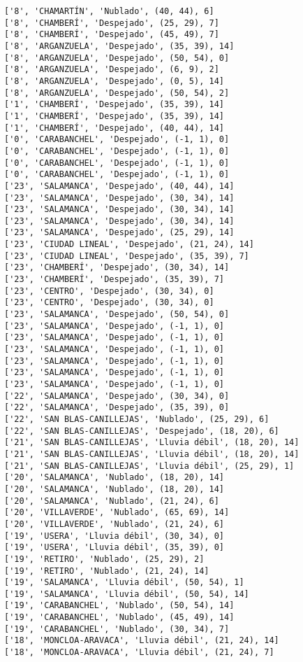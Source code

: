 \documentclass[11pt]{article}
\begin{document}
\begin{Verbatim}[commandchars=\\\{\}]
['8', 'CHAMARTÍN', 'Nublado', (40, 44), 6]
['8', 'CHAMBERÍ', 'Despejado', (25, 29), 7]
['8', 'CHAMBERÍ', 'Despejado', (45, 49), 7]
['8', 'ARGANZUELA', 'Despejado', (35, 39), 14]
['8', 'ARGANZUELA', 'Despejado', (50, 54), 0]
['8', 'ARGANZUELA', 'Despejado', (6, 9), 2]
['8', 'ARGANZUELA', 'Despejado', (0, 5), 14]
['8', 'ARGANZUELA', 'Despejado', (50, 54), 2]
['1', 'CHAMBERÍ', 'Despejado', (35, 39), 14]
['1', 'CHAMBERÍ', 'Despejado', (35, 39), 14]
['1', 'CHAMBERÍ', 'Despejado', (40, 44), 14]
['0', 'CARABANCHEL', 'Despejado', (-1, 1), 0]
['0', 'CARABANCHEL', 'Despejado', (-1, 1), 0]
['0', 'CARABANCHEL', 'Despejado', (-1, 1), 0]
['0', 'CARABANCHEL', 'Despejado', (-1, 1), 0]
['23', 'SALAMANCA', 'Despejado', (40, 44), 14]
['23', 'SALAMANCA', 'Despejado', (30, 34), 14]
['23', 'SALAMANCA', 'Despejado', (30, 34), 14]
['23', 'SALAMANCA', 'Despejado', (30, 34), 14]
['23', 'SALAMANCA', 'Despejado', (25, 29), 14]
['23', 'CIUDAD LINEAL', 'Despejado', (21, 24), 14]
['23', 'CIUDAD LINEAL', 'Despejado', (35, 39), 7]
['23', 'CHAMBERÍ', 'Despejado', (30, 34), 14]
['23', 'CHAMBERÍ', 'Despejado', (35, 39), 7]
['23', 'CENTRO', 'Despejado', (30, 34), 0]
['23', 'CENTRO', 'Despejado', (30, 34), 0]
['23', 'SALAMANCA', 'Despejado', (50, 54), 0]
['23', 'SALAMANCA', 'Despejado', (-1, 1), 0]
['23', 'SALAMANCA', 'Despejado', (-1, 1), 0]
['23', 'SALAMANCA', 'Despejado', (-1, 1), 0]
['23', 'SALAMANCA', 'Despejado', (-1, 1), 0]
['23', 'SALAMANCA', 'Despejado', (-1, 1), 0]
['23', 'SALAMANCA', 'Despejado', (-1, 1), 0]
['22', 'SALAMANCA', 'Despejado', (30, 34), 0]
['22', 'SALAMANCA', 'Despejado', (35, 39), 0]
['22', 'SAN BLAS-CANILLEJAS', 'Nublado', (25, 29), 6]
['22', 'SAN BLAS-CANILLEJAS', 'Despejado', (18, 20), 6]
['21', 'SAN BLAS-CANILLEJAS', 'Lluvia débil', (18, 20), 14]
['21', 'SAN BLAS-CANILLEJAS', 'Lluvia débil', (18, 20), 14]
['21', 'SAN BLAS-CANILLEJAS', 'Lluvia débil', (25, 29), 1]
['20', 'SALAMANCA', 'Nublado', (18, 20), 14]
['20', 'SALAMANCA', 'Nublado', (18, 20), 14]
['20', 'SALAMANCA', 'Nublado', (21, 24), 6]
['20', 'VILLAVERDE', 'Nublado', (65, 69), 14]
['20', 'VILLAVERDE', 'Nublado', (21, 24), 6]
['19', 'USERA', 'Lluvia débil', (30, 34), 0]
['19', 'USERA', 'Lluvia débil', (35, 39), 0]
['19', 'RETIRO', 'Nublado', (25, 29), 2]
['19', 'RETIRO', 'Nublado', (21, 24), 14]
['19', 'SALAMANCA', 'Lluvia débil', (50, 54), 1]
['19', 'SALAMANCA', 'Lluvia débil', (50, 54), 14]
['19', 'CARABANCHEL', 'Nublado', (50, 54), 14]
['19', 'CARABANCHEL', 'Nublado', (45, 49), 14]
['19', 'CARABANCHEL', 'Nublado', (30, 34), 7]
['18', 'MONCLOA-ARAVACA', 'Lluvia débil', (21, 24), 14]
['18', 'MONCLOA-ARAVACA', 'Lluvia débil', (21, 24), 7]

\end{Verbatim}
\end{document}
